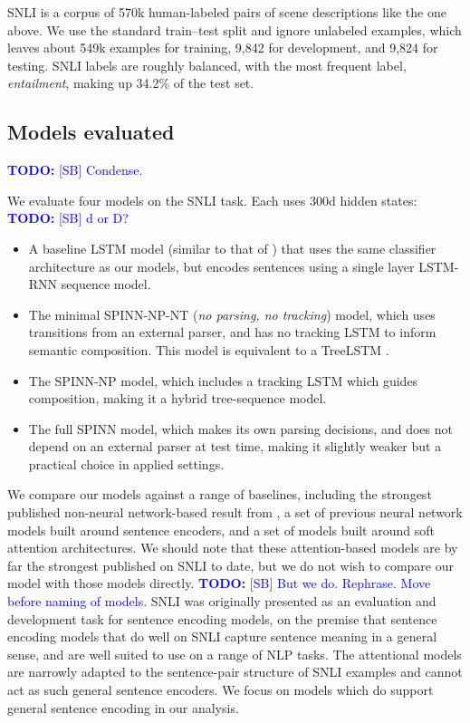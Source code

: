 \documentclass[11pt]{article}
\newcommand\todo[1]{\textcolor{blue}{\textbf{TODO:} #1}}
\begin{document}
SNLI is a corpus of 570k human-labeled pairs of scene descriptions like the one above. We use the standard train--test split and ignore unlabeled examples, which leaves about 549k examples for training, 9,842 for development, and 9,824 for testing. SNLI labels are roughly balanced, with the most frequent label, {\it entailment}, making up 34.2\% of the test set.


\subsection{Models evaluated} \todo{[SB] Condense.}

We evaluate four models on the SNLI task. Each uses 300d hidden states: \todo{[SB] d or D?}
\begin{itemize}
\item A baseline LSTM model (similar to that of \citet{snli:emnlp2015}) that uses the same classifier architecture as our models, but encodes sentences using a single layer LSTM-RNN sequence model.
\item The minimal SPINN-NP-NT (\textit{no parsing, no tracking}) model, which uses transitions from an external parser, and has no tracking LSTM to inform semantic composition. This model is equivalent to a TreeLSTM \citep{tai2015improved}.
\item The SPINN-NP model, which includes a tracking LSTM which guides composition, making it a hybrid tree-sequence model.
\item The full SPINN model, which makes its own parsing decisions, and does not depend on an external parser at test time, making it slightly weaker but a practical choice in applied settings.
\end{itemize}

We compare our models against a range of baselines, including the strongest published non-neural network-based result from \citep{snli:emnlp2015}, a set of previous neural network models built around sentence encoders, and a set of models built around soft attention architectures. We should note that these attention-based models are by far the strongest published on SNLI to date, but we do not wish to compare our model with those models directly. \todo{[SB] But we do. Rephrase. Move before naming of models.} SNLI was originally presented as an evaluation and development task for sentence encoding models, on the premise that sentence encoding models that do well on SNLI capture sentence meaning in a general sense, and are well suited to use on a range of NLP tasks. The attentional models are narrowly adapted to the sentence-pair structure of SNLI examples and cannot act as such general sentence encoders. We focus on models which do support general sentence encoding in our analysis.
\end{document}
